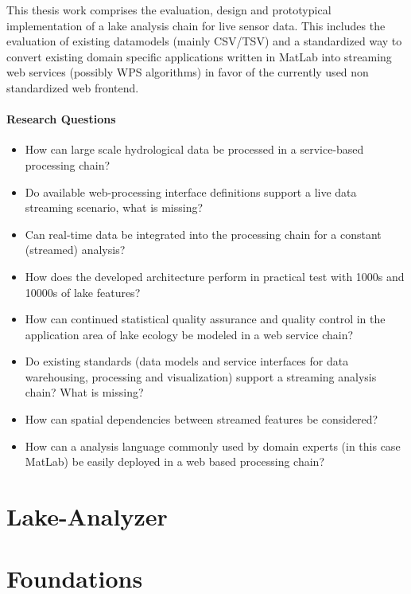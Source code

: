     This thesis work comprises the evaluation, design and prototypical implementation of a lake analysis chain for live sensor data.
    This includes the evaluation of existing datamodels (mainly CSV/TSV) and a standardized way to convert existing domain specific applications written in MatLab into streaming web services (possibly WPS algorithms) in favor of the currently used non standardized web frontend.

    \paragraph*{Research Questions}
    \begin{itemize}
        \item How can large scale hydrological data be processed in a service-based processing chain?
        \item Do available web-processing interface definitions support a live data streaming scenario, what is missing?
        \item Can real-time data be integrated into the processing chain for a constant (streamed) analysis?
        \item How does the developed architecture perform in practical test with 1000s and 10000s of lake features?
        \item How can continued statistical quality assurance and quality control in the application area of lake ecology be modeled in a web service chain?
        \item Do existing standards (data models and service interfaces for data warehousing, processing and visualization) support a streaming analysis chain? What is missing?
        \item How can spatial dependencies between streamed features be considered?
        \item How can a analysis language commonly used by domain experts (in this case MatLab) be easily deployed in a web based processing chain?
    \end{itemize}




\section{Lake-Analyzer}
\section{Foundations}
